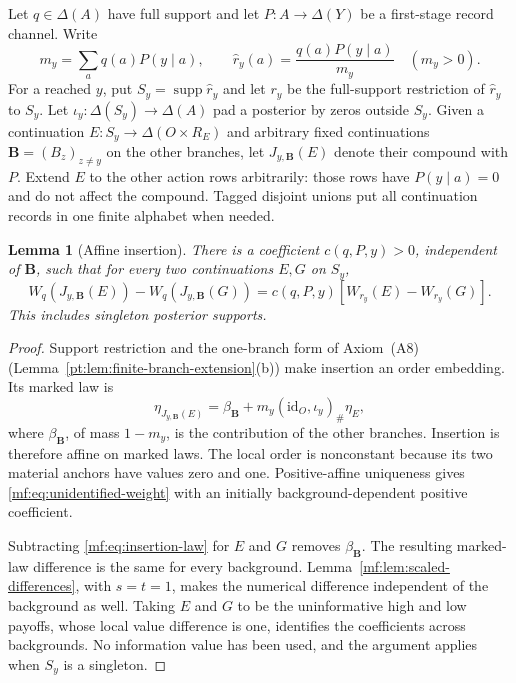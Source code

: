 \documentclass[11pt,a4paper]{article}
\newtheorem{lemma}[theorem]{Lemma}
\theoremstyle{definition}
\newcommand{\D}{\Delta}
\newcommand{\supp}{\operatorname{supp}}
\newcommand{\1}{\mathbf 1}
\begin{document}
Let $q\in\D(A)$ have full support and let $P:A\to\D(Y)$ be a first-stage
record channel.  Write
\[
 m_y=\sum_a q(a)P(y\mid a),\qquad
 \widehat r_y(a)=\frac{q(a)P(y\mid a)}{m_y}\quad(m_y>0).
\]
For a reached $y$, put $S_y=\supp\widehat r_y$ and let $r_y$ be the
full-support restriction of $\widehat r_y$ to $S_y$.  Let
$\iota_y:\D(S_y)\to\D(A)$ pad a posterior by zeros outside $S_y$.
Given a continuation $E:S_y\to\D(O\times R_E)$ and arbitrary fixed
continuations $\mathbf B=(B_z)_{z\ne y}$ on the other branches, let
$J_{y,\mathbf B}(E)$ denote their compound with $P$.  Extend $E$ to the
other action rows arbitrarily: those rows have $P(y\mid a)=0$ and do not
affect the compound.  Tagged disjoint unions put all continuation records
in one finite alphabet when needed.

\begin{lemma}[Affine insertion]\label{mf:lem:insertion-affine}
There is a coefficient $c(q,P,y)>0$, independent of $\mathbf B$, such that
for every two continuations $E,G$ on $S_y$,
\begin{equation}
 W_q(J_{y,\mathbf B}(E))-W_q(J_{y,\mathbf B}(G))
 =c(q,P,y)[W_{r_y}(E)-W_{r_y}(G)].
 \label{mf:eq:unidentified-weight}
\end{equation}
This includes singleton posterior supports.
\end{lemma}

\begin{proof}
Support restriction and the one-branch form of Axiom~\textup{(A8)}
(Lemma~\ref{pt:lem:finite-branch-extension}\textup{(b)}) make insertion an
order embedding.  Its marked law is
\begin{equation}
 \eta_{J_{y,\mathbf B}(E)}
 =\beta_{\mathbf B}+m_y(\mathrm{id}_O,\iota_y)_\#\eta_E,
 \label{mf:eq:insertion-law}
\end{equation}
where $\beta_{\mathbf B}$, of mass $1-m_y$, is the contribution of the
other branches.  Insertion is therefore affine on marked laws.  The local
order is nonconstant because its two material anchors have values zero and
one.  Positive-affine uniqueness gives \eqref{mf:eq:unidentified-weight}
with an initially background-dependent positive coefficient.

Subtracting \eqref{mf:eq:insertion-law} for $E$ and $G$ removes
$\beta_{\mathbf B}$.  The resulting marked-law difference is the same for
every background.  Lemma~\ref{mf:lem:scaled-differences}, with $s=t=1$,
makes the numerical difference independent of the background as well.
Taking $E$ and $G$ to be the uninformative high and low payoffs, whose local
value difference is one, identifies the coefficients across backgrounds.
No information value has been used, and the argument applies when $S_y$ is
a singleton.
\end{proof}
\end{document}
